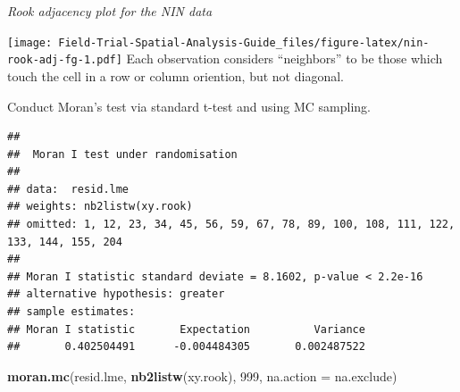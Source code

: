 \documentclass[]{book}
\newenvironment{Shaded}{\begin{snugshade}}{\end{snugshade}}
\newcommand{\DataTypeTok}[1]{\textcolor[rgb]{0.13,0.29,0.53}{#1}}
\newcommand{\DecValTok}[1]{\textcolor[rgb]{0.00,0.00,0.81}{#1}}
\newcommand{\KeywordTok}[1]{\textcolor[rgb]{0.13,0.29,0.53}{\textbf{#1}}}
\newcommand{\NormalTok}[1]{#1}
\newcommand{\OperatorTok}[1]{\textcolor[rgb]{0.81,0.36,0.00}{\textbf{#1}}}
\newcommand{\StringTok}[1]{\textcolor[rgb]{0.31,0.60,0.02}{#1}}
\begin{document}
\emph{Rook adjacency plot for the NIN data}

\begin{Shaded}
\end{Shaded}

\texttt{[image: Field-Trial-Spatial-Analysis-Guide\_files/figure-latex/nin-rook-adj-fg-1.pdf]}
Each observation considers ``neighbors'' to be those which touch the cell in a row or column oriention, but not diagonal.

Conduct Moran's test via standard t-test and using MC sampling.

\begin{Shaded}
\end{Shaded}

\begin{verbatim}
## 
##  Moran I test under randomisation
## 
## data:  resid.lme  
## weights: nb2listw(xy.rook) 
## omitted: 1, 12, 23, 34, 45, 56, 59, 67, 78, 89, 100, 108, 111, 122, 133, 144, 155, 204   
## 
## Moran I statistic standard deviate = 8.1602, p-value < 2.2e-16
## alternative hypothesis: greater
## sample estimates:
## Moran I statistic       Expectation          Variance 
##       0.402504491      -0.004484305       0.002487522
\end{verbatim}

\begin{Shaded}
\begin{Highlighting}[]
\KeywordTok{moran.mc}\NormalTok{(resid.lme, }\KeywordTok{nb2listw}\NormalTok{(xy.rook), }\DecValTok{999}\NormalTok{, }\DataTypeTok{na.action =}\NormalTok{ na.exclude)}
\end{Highlighting}
\end{Shaded}
\end{document}
